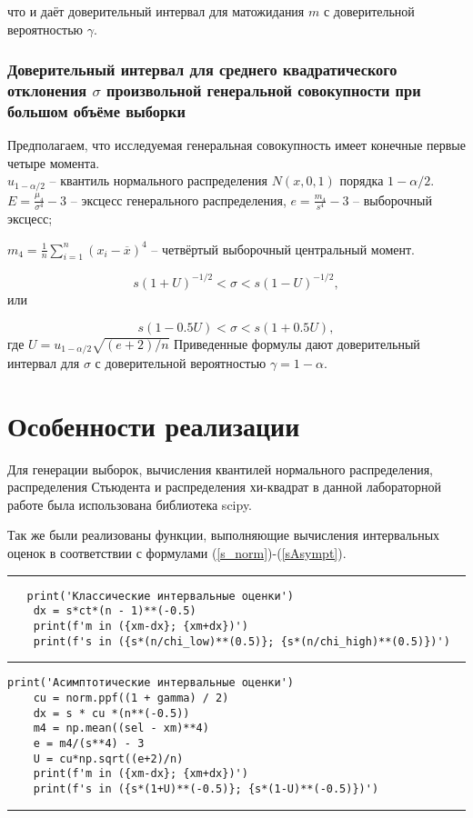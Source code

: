 \documentclass[12pt]{article}
\begin{document}
что и даёт доверительный интервал для матожидания $m$ с доверительной вероятностью $\gamma$. \cite{lit1}


\subsubsection{Доверительный интервал для среднего квадратического отклонения $\sigma$ произвольной генеральной совокупности при большом объёме выборки}
Предполагаем, что исследуемая генеральная совокупность имеет конечные первые четыре момента.\\
\vskip 0.1cm
$u_{1-\alpha/2}$ -- квантиль нормального распределения $N(x, 0, 1)$ порядка $1-\alpha/2$.\\
\vskip 0.1cm
$E = \frac{\mu_4}{\sigma^4} - 3$ -- эксцесс генерального распределения, $e = \frac{m_4}{s^4} - 3$ -- выборочный эксцесс; 
\par $m_4 = \frac{1}{n}\sum_{i=1}^{n}(x_i - \overline{x})^4$ -- четвёртый выборочный центральный момент.

\begin{equation}s(1 + U)^{-1/2} < \sigma < s(1 - U)^{-1/2}, 
\label{s_pr}
\end{equation}
или 

\begin{equation}s(1 - 0.5U) < \sigma < s(1 + 0.5U),
\label{sAsympt}
\end{equation}
где $U = u_{1-\alpha/2}\sqrt{(e+2)/n}$ 
\vskip 0.3cm
Приведенные формулы дают доверительный интервал для $\sigma$ с доверительной вероятностью $\gamma = 1-\alpha$. \cite{lit1}




\newpage
	\section{Особенности реализации}
	
		Для генерации выборок, вычисления квантилей нормального распределения, распределения Стьюдента и распределения хи-квадрат в  данной лабораторной работе была использована библиотека scipy.  
		
		Так же были реализованы функции, выполняющие вычисления интервальных оценок в соответствии с формулами (\ref{s_norm})-(\ref{sAsympt}).
\vskip 0.3cm
\hrule width 16cm height 1pt
\begin{verbatim}
   print('Классические интервальные оценки')
    dx = s*ct*(n - 1)**(-0.5)
    print(f'm in ({xm-dx}; {xm+dx})')
    print(f's in ({s*(n/chi_low)**(0.5)}; {s*(n/chi_high)**(0.5)})')
\end{verbatim}
\vskip 0.3cm
\hrule width 16cm height 1pt
\vskip 0.3cm
\begin{verbatim}
print('Асимптотические интервальные оценки')
    cu = norm.ppf((1 + gamma) / 2)
    dx = s * cu *(n**(-0.5))
    m4 = np.mean((sel - xm)**4)
    e = m4/(s**4) - 3
    U = cu*np.sqrt((e+2)/n)
    print(f'm in ({xm-dx}; {xm+dx})')
    print(f's in ({s*(1+U)**(-0.5)}; {s*(1-U)**(-0.5)})')
\end{verbatim}
\hrule width 16cm height 1pt
\newpage
\end{document}
